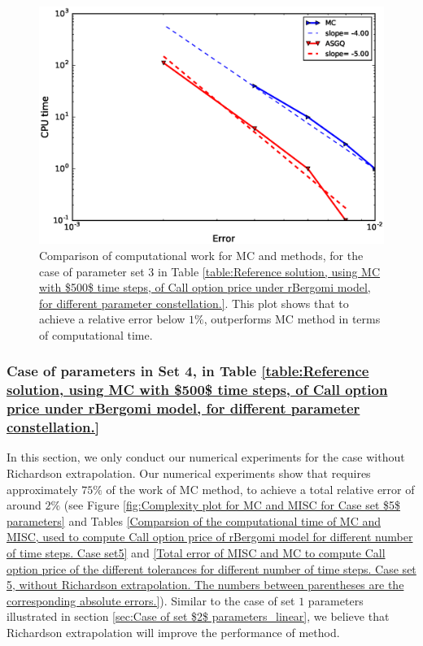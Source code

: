	\begin{figure}[h!]
	\centering
	\includegraphics[width=0.5\linewidth]{./figures/rBergomi_Complexity_rates/set6/error_vs_time_set6_full_comparison}
	
	\caption{Comparison of computational work for MC and  methods, for the case of parameter set $3$ in Table \ref{table:Reference solution, using MC with $500$ time steps, of Call option price under rBergomi model, for different parameter constellation.}. This plot shows that to achieve a relative error below $1\%$,  outperforms MC method in terms of computational time.}
	\label{fig:Complexity plot for MC and MISC for case set $4$ parameters}
\end{figure}
\FloatBarrier
\subsubsection{Case of parameters in Set 4, in Table \ref{table:Reference solution, using MC with $500$ time steps, of Call option price under rBergomi model, for different parameter constellation.} }\label{sec:Case of set 5 parameters}

In this section, we only conduct our numerical experiments for the case without Richardson extrapolation. Our numerical experiments show that   requires  approximately $75\%$ of the work of MC method, to achieve a total relative error of around $2\%$  (see Figure \ref{fig:Complexity plot for MC and MISC for Case set $5$ parameters} and Tables \ref{Comparsion of the computational time of  MC and MISC, used to compute Call option price of rBergomi model for different number of time steps. Case set5} and \ref{Total error of MISC and MC to compute Call option price of the different tolerances for different number of time steps. Case set 5, without Richardson extrapolation. The numbers between parentheses are the corresponding absolute errors.}). Similar to the case of set $1$ parameters illustrated in section \ref{sec:Case of set $2$ parameters_linear}, we believe that Richardson extrapolation will improve the performance of  method.   

